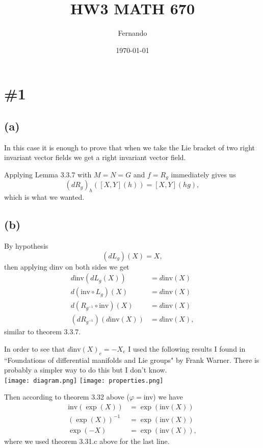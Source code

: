 \documentclass{article}
\begin{document}
\newcommand{\R}{\mathbb{R}}

\title{HW3 MATH 670}
\author{Fernando}
\date{\today}
\maketitle

\section*{\#1}
\subsection*{(a)}
In this case it is enough to prove that when we take the Lie bracket of two
right invariant vector fields we get a right invariant vector field.

Applying Lemma 3.3.7 with $M=N=G$ and $f=R_g$ immediately gives us
\[
  (dR_g)_h([X,Y](h))=[X,Y](hg),
\]
which is what we wanted.
\subsection*{(b)}
By hypothesis
\[
  (dL_g)(X)=X,
\]
then applying dinv on both sides we get
\begin{align*}
  d\text{inv}(dL_g(X))&=d\text{inv}(X)\\
  d(\text{inv}\circ L_g)(X)&=d\text{inv}(X)\\
  d(R_{g^{-1}}\circ \text{inv})(X)&=d\text{inv}(X)\\
  (dR_{g^{-1}})(d\text{inv}(X))&=d\text{inv}(X),
\end{align*}
similar to theorem 3.3.7.

In order to see that $d\text{inv}(X)_e=-X_e$ I used the following results I found in
``Foundations of differential manifolds and Lie groups" by Frank Warner. There is
probably a simpler way to do this but I don't know.\\
\texttt{[image: diagram.png]}
\texttt{[image: properties.png]}

Then according to theorem 3.32 above ($\varphi=$inv) we have
\begin{align*}
  \text{inv}(\exp(X))&=\exp(\text{inv}(X))\\
  (\exp(X))^{-1}&=\exp(\text{inv}(X))\\
  \exp(-X)&=\exp(\text{inv}(X)),
\end{align*}
where we used theorem 3.31.c above for the last line.
\end{document}
